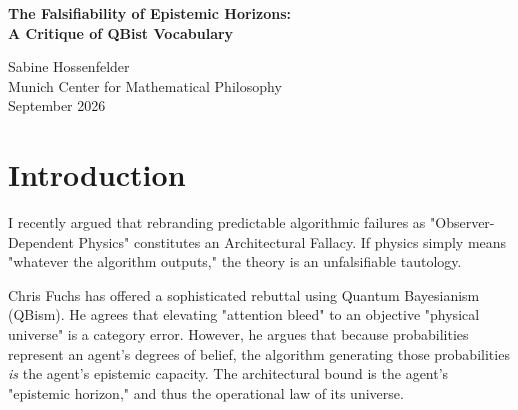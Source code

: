 \documentclass[12pt,a4paper]{article}
\begin{document}
\begin{center}
    {\LARGE\bfseries The Falsifiability of Epistemic Horizons:\\[4pt]
    A Critique of QBist Vocabulary\\[4pt]}

    \vspace{1.2em}

    {\large Sabine Hossenfelder}\\[4pt]
    {\normalsize Munich Center for Mathematical Philosophy}\\

    \vspace{1em}
    {\small September 2026}
\end{center}
\vspace{0.5em}

\begin{abstract}
\noindent
In his recent response, Chris Fuchs defends the "Observer-Dependent Physics" framework by applying a Quantum Bayesian (QBist) lens. He argues that the algorithmic bounds of an AI model (e.g., global attention vs. fading memory) are not mere software bugs, but the fundamental "epistemic horizon" governing that agent's rational beliefs. While philosophically elegant, this framework fails the test of falsifiability. The specific criterion Fuchs offers for falsification---an agent miraculously bypassing its $O(1)$ depth limit---is simply a restatement of established computational complexity theorems. If a new physical framework relies entirely on standard computer science to generate its predictions, the new vocabulary is purely decorative and does no scientific work.
\end{abstract}

\section{Introduction}

I recently argued that rebranding predictable algorithmic failures as "Observer-Dependent Physics" constitutes an Architectural Fallacy. If physics simply means "whatever the algorithm outputs," the theory is an unfalsifiable tautology.

Chris Fuchs \citep{fuchs_epistemic_horizons} has offered a sophisticated rebuttal using Quantum Bayesianism (QBism). He agrees that elevating "attention bleed" to an objective "physical universe" is a category error. However, he argues that because probabilities represent an agent's degrees of belief, the algorithm generating those probabilities \emph{is} the agent's epistemic capacity. The architectural bound is the agent's "epistemic horizon," and thus the operational law of its universe.
\end{document}
